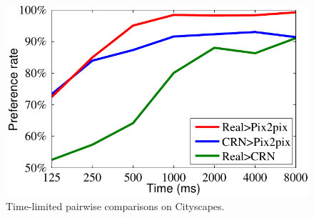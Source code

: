 \begin{figure}[h]
\centering
\includegraphics[width=0.95\linewidth]{figures/cityscapes_plot6.pdf}
\caption{Time-limited pairwise comparisons on Cityscapes.}
\label{fig:cityscapes-timed}
\vspace{-1mm}
\end{figure}


